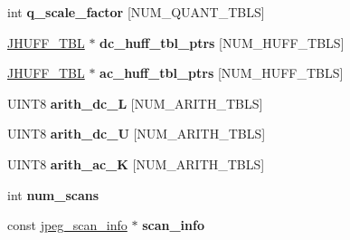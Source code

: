 \begin{DoxyCompactItemize}
\item 
\hypertarget{structjpeg__compress__struct_a3d8545504353556fae60e1e865d2c600}{int {\bfseries q\+\_\+scale\+\_\+factor} \mbox{[}N\+U\+M\+\_\+\+Q\+U\+A\+N\+T\+\_\+\+T\+B\+L\+S\mbox{]}}\label{structjpeg__compress__struct_a3d8545504353556fae60e1e865d2c600}

\item 
\hypertarget{structjpeg__compress__struct_a6a69e90a68e1f7f46774d83ba3737a4e}{\hyperlink{struct_j_h_u_f_f___t_b_l}{J\+H\+U\+F\+F\+\_\+\+T\+B\+L} $\ast$ {\bfseries dc\+\_\+huff\+\_\+tbl\+\_\+ptrs} \mbox{[}N\+U\+M\+\_\+\+H\+U\+F\+F\+\_\+\+T\+B\+L\+S\mbox{]}}\label{structjpeg__compress__struct_a6a69e90a68e1f7f46774d83ba3737a4e}

\item 
\hypertarget{structjpeg__compress__struct_a98d33cae3c8eee8f1f8d662e31cb905d}{\hyperlink{struct_j_h_u_f_f___t_b_l}{J\+H\+U\+F\+F\+\_\+\+T\+B\+L} $\ast$ {\bfseries ac\+\_\+huff\+\_\+tbl\+\_\+ptrs} \mbox{[}N\+U\+M\+\_\+\+H\+U\+F\+F\+\_\+\+T\+B\+L\+S\mbox{]}}\label{structjpeg__compress__struct_a98d33cae3c8eee8f1f8d662e31cb905d}

\item 
\hypertarget{structjpeg__compress__struct_a736d867907116e88b3b38422fb2688c5}{U\+I\+N\+T8 {\bfseries arith\+\_\+dc\+\_\+\+L} \mbox{[}N\+U\+M\+\_\+\+A\+R\+I\+T\+H\+\_\+\+T\+B\+L\+S\mbox{]}}\label{structjpeg__compress__struct_a736d867907116e88b3b38422fb2688c5}

\item 
\hypertarget{structjpeg__compress__struct_a6ba30334643b7a5280343fe0e5e49e1e}{U\+I\+N\+T8 {\bfseries arith\+\_\+dc\+\_\+\+U} \mbox{[}N\+U\+M\+\_\+\+A\+R\+I\+T\+H\+\_\+\+T\+B\+L\+S\mbox{]}}\label{structjpeg__compress__struct_a6ba30334643b7a5280343fe0e5e49e1e}

\item 
\hypertarget{structjpeg__compress__struct_ac1994386d3fa3ff139b63bf4bb4dcc36}{U\+I\+N\+T8 {\bfseries arith\+\_\+ac\+\_\+\+K} \mbox{[}N\+U\+M\+\_\+\+A\+R\+I\+T\+H\+\_\+\+T\+B\+L\+S\mbox{]}}\label{structjpeg__compress__struct_ac1994386d3fa3ff139b63bf4bb4dcc36}

\item 
\hypertarget{structjpeg__compress__struct_abf2f96c340659a09a9ce08469a17e08b}{int {\bfseries num\+\_\+scans}}\label{structjpeg__compress__struct_abf2f96c340659a09a9ce08469a17e08b}

\item 
\hypertarget{structjpeg__compress__struct_a545fed3fef0d0c5962dbe0e80c067c03}{const \hyperlink{structjpeg__scan__info}{jpeg\+\_\+scan\+\_\+info} $\ast$ {\bfseries scan\+\_\+info}}\label{structjpeg__compress__struct_a545fed3fef0d0c5962dbe0e80c067c03}


\end{DoxyCompactItemize}
